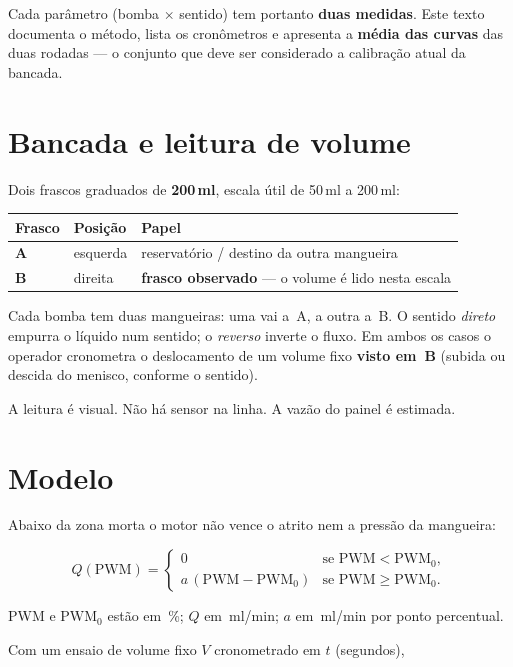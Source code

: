 \documentclass[11pt,a4paper]{article}
\newcommand{\pwmz}{\mathrm{PWM}_0}
\begin{document}
Cada parâmetro (bomba $\times$ sentido) tem portanto \textbf{duas medidas}.
Este texto documenta o método, lista os cronômetros e apresenta a
\textbf{média das curvas} das duas rodadas --- o conjunto que deve ser
considerado a calibração atual da bancada.

\section{Bancada e leitura de volume}

Dois frascos graduados de \textbf{200\,ml}, escala útil de 50\,ml a 200\,ml:

\begin{center}
\begin{tabular}{@{}lll@{}}
\toprule
Frasco & Posição & Papel \\
\midrule
\textbf{A} & esquerda & reservatório / destino da outra mangueira \\
\textbf{B} & direita & \textbf{frasco observado} --- o volume é lido nesta escala \\
\bottomrule
\end{tabular}
\end{center}

Cada bomba tem duas mangueiras: uma vai a~A, a outra a~B. O sentido
\emph{direto} empurra o líquido num sentido; o \emph{reverso} inverte o fluxo.
Em ambos os casos o operador cronometra o deslocamento de um volume fixo
\textbf{visto em~B} (subida ou descida do menisco, conforme o sentido).

A leitura é visual. Não há sensor na linha. A vazão do painel é estimada.

\section{Modelo}
\label{sec:modelo}

Abaixo da zona morta o motor não vence o atrito nem a pressão da mangueira:

\begin{equation}
Q(\mathrm{PWM}) =
\begin{cases}
0 & \text{se }\mathrm{PWM} < \pwmz, \\
a\,(\mathrm{PWM} - \pwmz) & \text{se }\mathrm{PWM} \ge \pwmz.
\end{cases}
\end{equation}

PWM e $\pwmz$ estão em~\%; $Q$ em~ml/min; $a$ em~ml/min por ponto percentual.

Com um ensaio de volume fixo $V$ cronometrado em $t$ (segundos),
\end{document}

